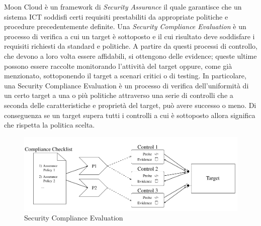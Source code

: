 Moon Cloud è un framework di \textit{Security Assurance} il quale garantisce che un sistema ICT soddisfi certi requisiti 
prestabiliti da appropriate politiche e procedure precedentemente definite.
Una \textit{Security Compliance Evaluation} è un processo di verifica a cui un target è sottoposto e il cui risultato 
deve soddisfare i requisiti richiesti da standard e politiche. A partire da questi processi di controllo, che devono a loro volta essere 
affidabili, si ottengono delle evidence; queste ultime possono essere raccolte monitorando l'attività del target oppure, come già 
menzionato, sottoponendo il target a scenari critici o di testing.\hfill\break
In particolare, una Security Compliance Evaluation è un processo di verifica dell'uniformità di un certo target a una o più politiche 
attraverso una serie di controlli che a seconda delle caratteristiche e proprietà del target, può avere successo o meno. Di 
conseguenza se un target supera tutti i controlli a cui è sottoposto allora significa che rispetta la politica scelta.
\begin{figure}[ht!]
    \includegraphics[scale=0.5]{images/Security_Compliance_Evaluation.png}
    \caption{Security Compliance Evaluation}
    \label{fig:Security_Compliance_Evaluation}
\end{figure}
%

